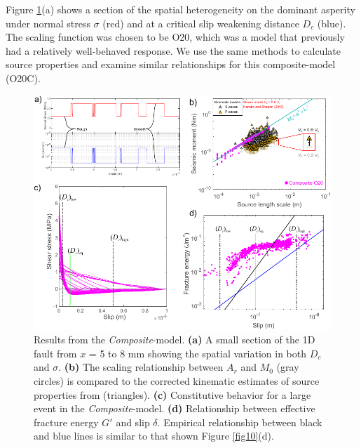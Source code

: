 \documentclass[preprint,1p, 10pt,authoryear]{elsarticle}
\begin{document}
Figure \ref{fig12}(a) shows a section of the spatial heterogeneity on the dominant asperity under normal stress $\sigma$ (red) and at a critical slip weakening distance $D_{c}$ (blue).  The scaling function was chosen to be O20, which was a model that previously had a relatively well-behaved response.  We use the same methods to calculate source properties and examine similar relationships for this composite-model (O20C).

\begin{figure}
	\centering
	\includegraphics{FIG12_revised.pdf} 
	\caption{Results from the \textit{Composite}-model. \textbf{(a)} A small section of the 1D fault from $x$ = 5 to 8 mm showing the spatial variation in both $D_{c}$ and $\sigma$. \textbf{(b)} The scaling relationship between $A_{r}$ and $M_{0}$ (gray circles) is compared to the corrected kinematic estimates of source properties from \citet{Selvadurai2019} (triangles).   \textbf{(c)} Constitutive behavior for a large event in the \textit{Composite}-model. \textbf{(d)} Relationship between effective fracture energy $G'$ and slip $\delta$. Empirical relationship between black and blue lines is similar to that shown Figure \ref{fig10}(d).}
	\label{fig12}
\end{figure}
\end{document}

